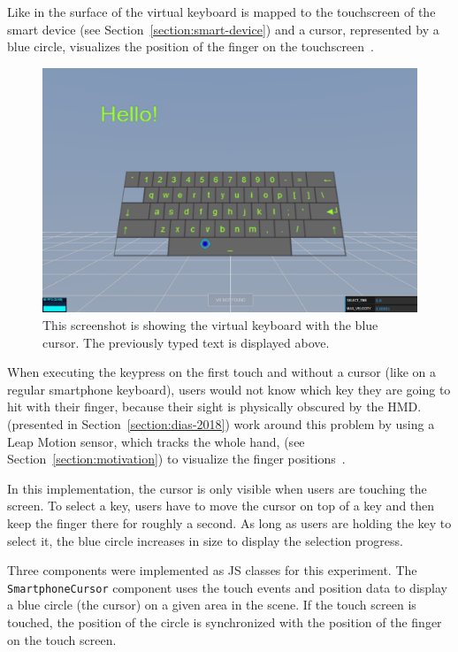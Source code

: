 Like in  the surface of the virtual keyboard is mapped to the touchscreen of the smart device (see Section~\ref{section:smart-device}) and a cursor, represented by a blue circle, visualizes the position of the finger on the touchscreen~\cite[408]{Markussen.2013}.

\begin{figure}[H]
	\centering
	\includegraphics[width=12cm]{figures/implementation/screenshot_exp_vk.png}
	\caption[Screenshot of the virtual keyboard]{This screenshot is showing the virtual keyboard with the blue cursor. The previously typed text is displayed above.}\label{fig:screenshot-exp-vk}
\end{figure}

When executing the keypress on the first touch and without a cursor (like on a regular smartphone keyboard), users would not know which key they are going to hit with their finger, because their sight is physically obscured by the \gls{HMD}. \citeauthor{Dias.2018} (presented in Section~\ref{section:dias-2018}) work around this problem by using a Leap Motion sensor, which tracks the whole hand, (see Section~\ref{section:motivation}) to visualize the finger positions~\cite[4]{Dias.2018}.

In this implementation, the cursor is only visible when users are touching the screen. To select a key, users have to move the cursor on top of a key and then keep the finger there for roughly a second. As long as users are holding the key to select it, the blue circle increases in size to display the selection progress.

Three components were implemented as \acrlong{JS} classes for this experiment. The \lstinline{SmartphoneCursor} component uses the touch events and position data to display a blue circle (the cursor) on a given area in the scene. If the touch screen is touched, the position of the circle is synchronized with the position of the finger on the touch screen.

